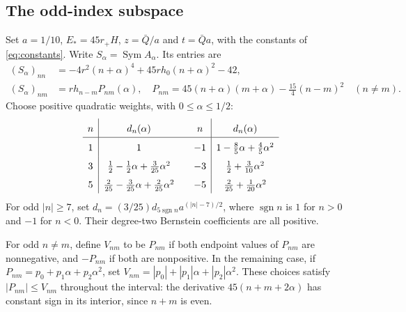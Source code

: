 \documentclass[a4paper,11pt]{article}
\numberwithin{equation}{section}
\theoremstyle{definition}
\theoremstyle{remark}
\newcommand{\Sym}{\operatorname{Sym}}
\begin{document}
\subsection{The odd-index subspace}\label{subsec:odd-bloch}
Set $a=1/10$, $E_*=45r_+H$, $z=\bar Q/a$ and $t=\bar Qa$, with the constants of \eqref{eq:constants}. Write $S_\alpha=\Sym A_\alpha$. Its entries are
\begin{align}
 (S_\alpha)_{nn}&=-4r^2(n+\alpha)^4+45rh_0(n+\alpha)^2-42,\label{eq:odd-diag}\\
 (S_\alpha)_{nm}&=rh_{n-m}P_{nm}(\alpha),\quad
 P_{nm}=45(n+\alpha)(m+\alpha)-\tfrac{15}{4}(n-m)^2\quad(n\ne m).
 \label{eq:odd-off}
\end{align}
Choose positive quadratic weights, with $0\le\alpha\le1/2$:
\begin{equation}\label{eq:odd-weights}
\renewcommand{\arraystretch}{1.6}
\begin{array}{c|c@{\qquad}c|c}
 n&d_n(\alpha)&n&d_n(\alpha)\\\hline
 1&1&-1&1-\frac85\alpha+\frac45\alpha^2\\
 3&\frac12-\frac12\alpha+\frac3{25}\alpha^2&-3&\frac12+\frac3{10}\alpha^2\\
 5&\frac2{25}-\frac3{25}\alpha+\frac2{25}\alpha^2&-5&\frac2{25}+\frac1{20}\alpha^2
\end{array}
\end{equation}
For odd $|n|\ge7$, set $d_n=(3/25)d_{5\operatorname{sgn}n}a^{(|n|-7)/2}$, where $\operatorname{sgn}n$ is $1$ for $n>0$ and $-1$ for $n<0$. Their degree-two Bernstein coefficients are all positive.

For odd $n\ne m$, define $V_{nm}$ to be $P_{nm}$ if both endpoint values of $P_{nm}$ are nonnegative, and $-P_{nm}$ if both are nonpositive. In the remaining case, if $P_{nm}=p_0+p_1\alpha+p_2\alpha^2$, set $V_{nm}=|p_0|+|p_1|\alpha+|p_2|\alpha^2$. These choices satisfy $|P_{nm}|\le V_{nm}$ throughout the interval: the derivative $45(n+m+2\alpha)$ has constant sign in its interior, since $n+m$ is even.
\end{document}
